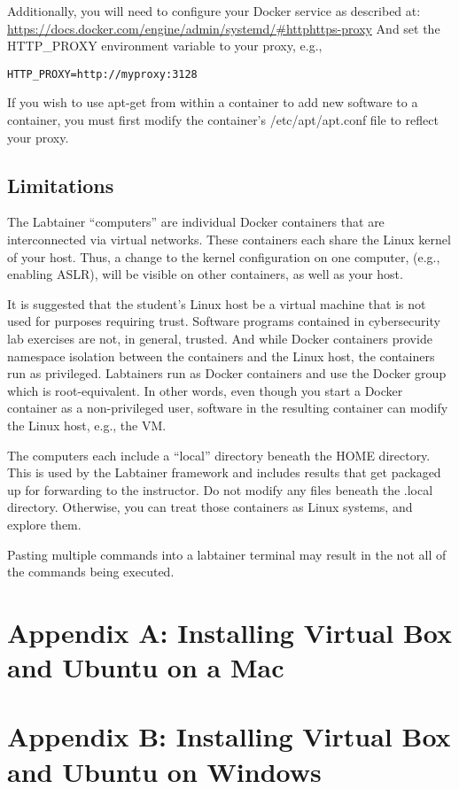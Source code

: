 \documentclass[12pt]{article}
\begin{document}
Additionally, you will need to configure your Docker service as described at:
\url{https://docs.docker.com/engine/admin/systemd/#httphttps-proxy}
And set the HTTP\_PROXY environment variable to your proxy, e.g., 
\begin{verbatim}
HTTP_PROXY=http://myproxy:3128
\end{verbatim}
If you wish to use apt-get from within a container to add new software to a container, you
must first modify the container's /etc/apt/apt.conf file to reflect your proxy.

\subsection{Limitations}
The Labtainer ``computers'' are individual Docker containers that are interconnected via virtual
networks.  These containers each share the Linux kernel of your host.  Thus, a change
to the kernel configuration on one computer, (e.g., enabling ASLR), will be visible on
other containers, as well as your host.

It is suggested that the student's Linux host be a virtual machine that is
not used for purposes requiring trust.  Software programs contained in cybersecurity lab
exercises are not, in general, trusted.  And while Docker containers provide namespace
isolation between the containers and the Linux host, the containers run as privileged.
Labtainers run as Docker containers and use the Docker group 
which is root-equivalent.  In other words, even though you start a Docker container
as a non-privileged user, software in the resulting container can modify the Linux host,
e.g., the VM.

The computers each include a ``local'' directory beneath the HOME directory.  This is used
by the Labtainer framework and includes results that get packaged up for forwarding to the
instructor.  Do not modify any files beneath the .local directory.  Otherwise, you can treat
those containers as Linux systems, and explore them.

Pasting multiple commands into a labtainer terminal may result in the not all of the
commands being executed.


\appendix 
\section {Appendix A: Installing Virtual Box and Ubuntu on a Mac}

\appendix 
\section {Appendix B: Installing Virtual Box and Ubuntu on Windows}

\appendix 
\end{document}
